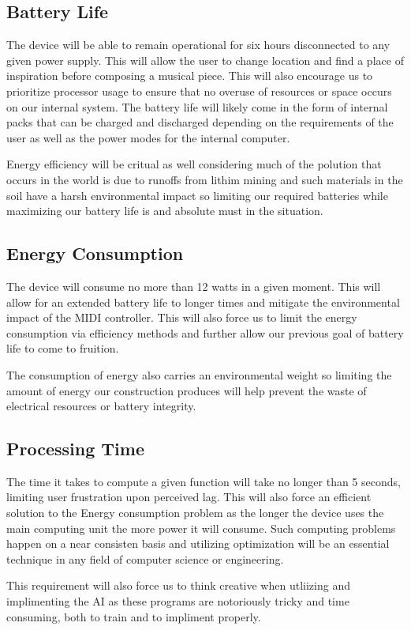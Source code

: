 \subsection{Battery Life}

The device will be able to remain operational for six hours disconnected to any given
power supply. This will allow the user to change location and find a place of inspiration
before composing a musical piece. This will also encourage us to prioritize processor
usage to ensure that no overuse of resources or space occurs on our internal system. The
battery life will likely come in the form of internal packs that can be charged and
discharged depending on the requirements of the user as well as the power modes for the
internal computer. 

Energy efficiency will be critual as well considering much of the polution that occurs in
the world is due to runoffs from lithim mining and such materials in the soil have a harsh
environmental impact so limiting our required batteries while maximizing our battery life
is and absolute must in the situation.

\subsection{Energy Consumption}

The device will consume no more than 12 watts in a given moment. This will allow for an
extended battery life to longer times and mitigate the environmental impact of the MIDI
controller. This will also force us to limit the energy consumption via efficiency methods
and further allow our previous goal of battery life to come to fruition. 

The consumption of energy also carries an environmental weight so limiting the amount of
energy our construction produces will help prevent the waste of electrical resources or
battery integrity.

\subsection{Processing Time}

The time it takes to compute a given function will take no longer than 5 seconds, limiting
user frustration upon perceived lag. This will also force an efficient solution to the
Energy consumption problem as the longer the device uses the main computing unit the more
power it will consume. Such computing problems happen on a near consisten basis and
utilizing optimization will be an essential technique in any field of computer science or
engineering.

This requirement will also force us to think creative when utliizing and implimenting the
AI as these programs are notoriously tricky and time consuming, both to train and to
impliment properly. 
